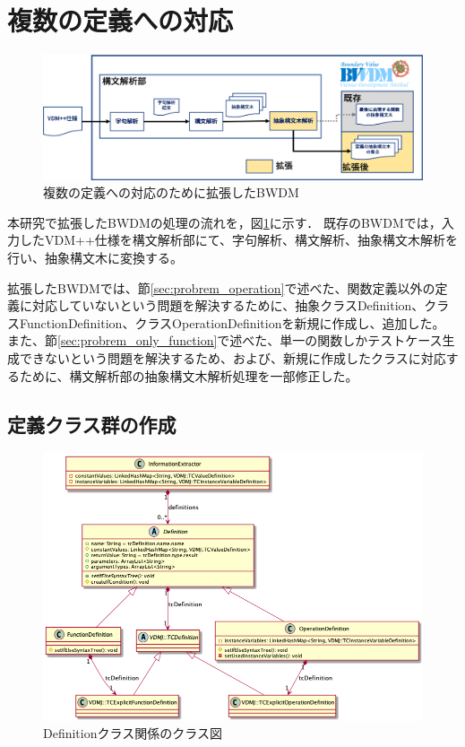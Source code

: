 \documentclass[uplatex, report, a4j, 10pt]{jsbook}
\begin{document}
\section{複数の定義への対応}
\begin{figure}[tp]
  \centering
  \includegraphics[keepaspectratio, width=160mm]{figs/multi_bwdm_structure}
  \caption{複数の定義への対応のために拡張したBWDM}
  \label{fig:multi_bwdm_structure}
\end{figure}

本研究で拡張したBWDMの処理の流れを，図\ref{fig:multi_bwdm_structure}に示す．
既存のBWDMでは，入力したVDM++仕様を構文解析部にて、字句解析、構文解析、抽象構文木解析を行い、抽象構文木に変換する。

拡張したBWDMでは、節\ref{sec:probrem_operation}で述べた、関数定義以外の定義に対応していないという問題を解決するために、抽象クラスDefinition、クラスFunctionDefinition、クラスOperationDefinitionを新規に作成し、追加した。
また、節\ref{sec:probrem_only_function}で述べた、単一の関数しかテストケース生成できないという問題を解決するため、および、新規に作成したクラスに対応するために、構文解析部の抽象構文木解析処理を一部修正した。

\subsection{定義クラス群の作成}
\begin{figure}[tp]
  \centering
  \includegraphics[keepaspectratio, width=160mm]{figs/Definition_class_diagram}
  \caption{Definitionクラス関係のクラス図}
  \label{fig:definition_class}
\end{figure}
\end{document}
